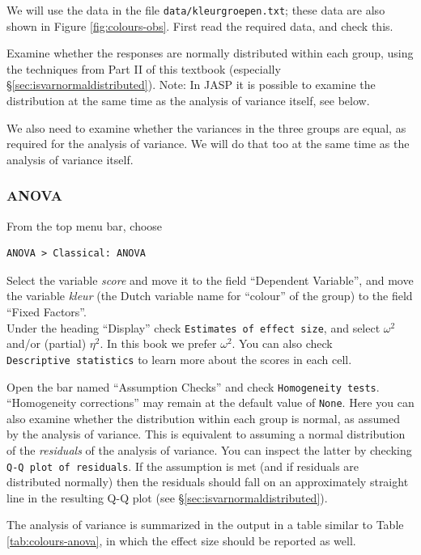 \documentclass[
]{book}
\begin{document}
We will use the data in the file \texttt{data/kleurgroepen.txt}; these data are also shown in Figure \ref{fig:colours-obs}.
First read the required data, and check this.

Examine whether the responses are normally distributed within each group, using the
techniques from Part II of this textbook (especially
§\ref{sec:isvarnormaldistributed}).
Note: In JASP it is possible to examine the distribution at the same time as the analysis of variance itself, see below.

We also need to examine whether the variances in the three groups
are equal, as required for the analysis of variance. We will do that too at the same
time as the analysis of variance itself.

\hypertarget{anova-1}{%
\subsubsection{ANOVA}\label{anova-1}}

From the top menu bar, choose

\begin{verbatim}
ANOVA > Classical: ANOVA
\end{verbatim}

Select the variable \emph{score} and move it to the field ``Dependent Variable'', and move the variable \emph{kleur} (the Dutch variable name for ``colour'' of the group) to the field ``Fixed Factors''.\\
Under the heading ``Display'' check \texttt{Estimates\ of\ effect\ size}, and select \(\omega^2\) and/or (partial) \(\eta^2\). In this book we prefer \(\omega^2\).
You can also check \texttt{Descriptive\ statistics} to learn more about the scores in each cell.

Open the bar named ``Assumption Checks'' and check \texttt{Homogeneity\ tests}.
``Homogeneity corrections'' may remain at the default value of \texttt{None}.
Here you can also examine whether the distribution within each group is normal, as assumed by the analysis of variance. This is equivalent to assuming a normal distribution of the \emph{residuals} of the analysis of variance. You can inspect the latter by checking \texttt{Q-Q\ plot\ of\ residuals}. If the assumption is met (and if residuals are distributed normally) then the residuals should fall on an approximately straight line in the resulting Q-Q plot (see §\ref{sec:isvarnormaldistributed}).

The analysis of variance is summarized in the output in a table similar to Table \ref{tab:colours-anova}, in which the effect size should be reported as well.
\end{document}
